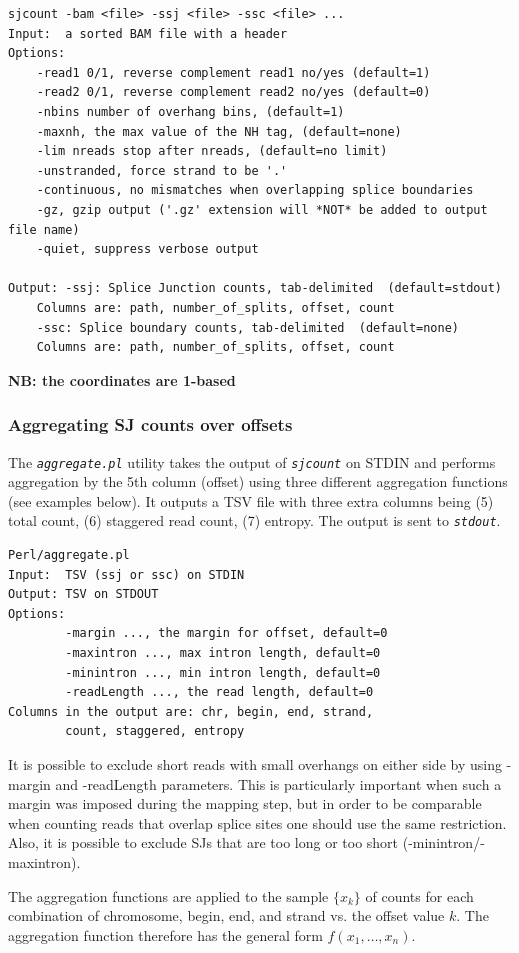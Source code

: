 \documentclass{article}
\newcommand{\prog}[1]{{\tt\em #1}}
\begin{document}
\begin{verbatim}
sjcount -bam <file> -ssj <file> -ssc <file> ...
Input:  a sorted BAM file with a header
Options:
	-read1 0/1, reverse complement read1 no/yes (default=1)
	-read2 0/1, reverse complement read2 no/yes (default=0)
	-nbins number of overhang bins, (default=1)
	-maxnh, the max value of the NH tag, (default=none)
	-lim nreads stop after nreads, (default=no limit)
	-unstranded, force strand to be '.'
	-continuous, no mismatches when overlapping splice boundaries
	-gz, gzip output ('.gz' extension will *NOT* be added to output file name)
	-quiet, suppress verbose output

Output:	-ssj: Splice Junction counts, tab-delimited  (default=stdout)
	Columns are: path, number_of_splits, offset, count
	-ssc: Splice boundary counts, tab-delimited  (default=none)
	Columns are: path, number_of_splits, offset, count
\end{verbatim}
{\bf NB: the coordinates are 1-based}


\subsubsection{Aggregating SJ counts over offsets}
The \prog{aggregate.pl} utility takes the output of \prog{sjcount} on STDIN and performs aggregation by the 5th column (offset) using three different aggregation functions 
(see examples below). It outputs a TSV file with three extra columns being (5) total count, (6) staggered read count, (7) entropy. The output is sent to \prog{stdout}. 
\begin{verbatim}
Perl/aggregate.pl   
Input:  TSV (ssj or ssc) on STDIN
Output: TSV on STDOUT
Options:
        -margin ..., the margin for offset, default=0
        -maxintron ..., max intron length, default=0
        -minintron ..., min intron length, default=0
        -readLength ..., the read length, default=0
Columns in the output are: chr, begin, end, strand, 
        count, staggered, entropy
\end{verbatim}
It is possible to exclude short reads with small overhangs on either side by using -margin and -readLength parameters. This is particularly important when such a margin 
was imposed during the mapping step, but in order to be comparable when counting reads that overlap splice sites one should use the same restriction. Also, it is possible 
to exclude SJs that are too long or too short (-minintron/-maxintron).

The aggregation functions are applied to the sample $\{x_k\}$ of counts for each combination of chromosome, begin, end, and strand vs. the offset value $k$. 
The aggregation function therefore has the general form $f(x_1,\dots,x_n)$. 
\end{document}

